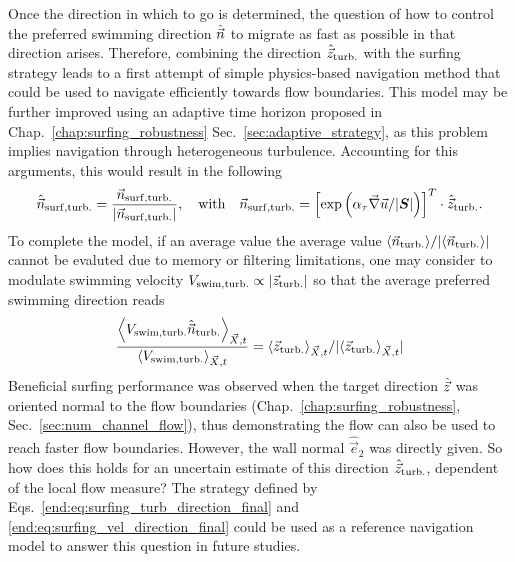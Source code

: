 Once the direction in which to go is determined, the question of how to control the preferred swimming direction $\hat{\vec{n}}$ to migrate as fast as possible in that direction arises.
Therefore, combining the direction $\hat{\vec{z}}_{\mathrm{turb.}}$ with the surfing strategy leads to a first attempt of simple physics-based navigation method that could be used to navigate efficiently towards flow boundaries.
This model may be further improved using an adaptive time horizon proposed in Chap.~\ref{chap:surfing_robustness} Sec.~\ref{sec:adaptive_strategy}, as this problem implies navigation through heterogeneous turbulence.
Accounting for this arguments, this would result in the following
\begin{equation}
	\label{end:eq:surfing_turb_direction_final}
	\hat{\vec{n}}_{\mathrm{surf}, \mathrm{turb.}} = \frac{\vec{n}_{\mathrm{surf}, \mathrm{turb.}}}{\lvert\vec{n}_{\mathrm{surf}, \mathrm{turb.}}\rvert}, \quad \text{with} \quad \vec{n}_{\mathrm{surf}, \mathrm{turb.}} = \left[ \exp \left( \alpha_{\tau} \vec{\nabla} \vec{u} / \lvert\boldsymbol{S}\rvert \right) \right]^T \cdot \hat{\vec{z}}_{\mathrm{turb.}}.
\end{equation}
To complete the model, if an average value the average value $\langle \vec{n}_{\mathrm{turb.}} \rangle / \lvert\langle \vec{n}_{\mathrm{turb.}} \rangle\rvert$ cannot be evaluted due to memory or filtering limitations, one may consider to modulate swimming velocity $V_{\mathrm{swim}, \mathrm{turb.}} \propto \lvert\vec{z}_{\mathrm{turb.}}\rvert$ so that the average preferred swimming direction reads
\begin{equation}
	\label{end:eq:surfing_vel_direction_final}
	\frac{\left\langle V_{\mathrm{swim}, \mathrm{turb.}} \hat{\vec{n}}_{\mathrm{turb.}} \right\rangle_{\vec{X}, t}}{\left\langle V_{\mathrm{swim}, \mathrm{turb.}} \right\rangle_{\vec{X}, t}} = \langle \vec{z}_{\mathrm{turb.}} \rangle_{\vec{X},t} / \lvert\langle \vec{z}_{\mathrm{turb.}} \rangle_{\vec{X},t}\rvert
\end{equation}
Beneficial surfing performance was observed when the target direction $\hat{\vec{z}}$ was oriented normal to the flow boundaries (Chap.~\ref{chap:surfing_robustness}, Sec.~\ref{sec:num_channel_flow}), thus demonstrating the flow can also be used to reach faster flow boundaries.
However, the wall normal $\hat{\vec{e}}_{2}$ was directly given.
So how does this holds for an uncertain estimate of this direction $\hat{\vec{z}}_{\mathrm{turb.}}$, dependent of the local flow measure?
The strategy defined by Eqs.~\eqref{end:eq:surfing_turb_direction_final} and \eqref{end:eq:surfing_vel_direction_final} could be used as a reference navigation model to answer this question in future studies.

